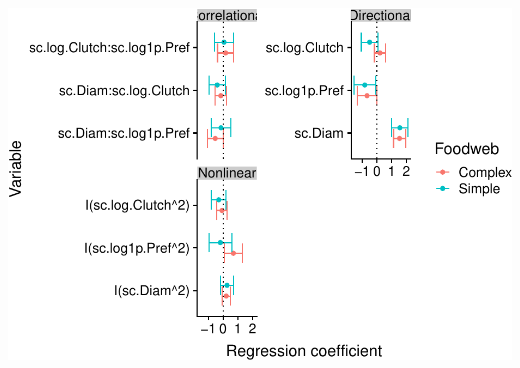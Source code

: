 \documentclass[]{elsarticle} %
\makeatletter
\def\maxwidth{\ifdim\Gin@nat@width>\linewidth\linewidth
\else\Gin@nat@width\fi}
\let\Oldincludegraphics\includegraphics
\renewcommand{\includegraphics}[1]{\Oldincludegraphics[width=\maxwidth]{#1}}
\makeatother
\begin{document}
\includegraphics{ms_complexity_selection_files/figure-latex/Get Selection Gradients for GLMER-1.pdf}
\end{document}
